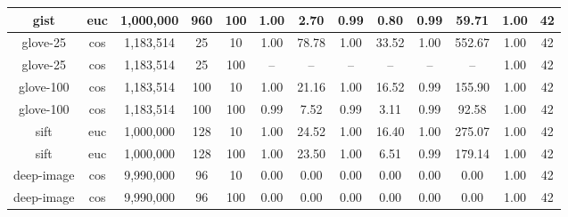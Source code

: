 \begin{table*}[!t]
\begin{center}
\begin{small}
\begin{sc}
\begin{tabular}{|c|c|c|c|c|c|c|c|c|c|c|c|c|}
    \hline
    gist             & euc              & 1,000,000          & 960             & 100        & 1.00 & 2.70                           & 0.99 & 0.80                                 & 0.99 & 59.71                                                    & 1.00 & 42 \\
    \hline
    glove-25         & cos              & 1,183,514          & 25             & 10         & 1.00 & 78.78                          & 1.00 & 33.52                              & 1.00 & 552.67                                                  & 1.00 & 42 \\
    \hline
    glove-25         & cos              & 1,183,514          & 25             & 100        & -- & --                                & -- & --                                & -- & --                                                    & 1.00 & 42 \\
    \hline
    glove-100        & cos              & 1,183,514          & 100            & 10         & 1.00 & 21.16                          & 1.00 & 16.52                                & 0.99 & 155.90                                                  & 1.00 & 42 \\
    \hline
    glove-100        & cos              & 1,183,514          & 100            & 100        & 0.99 &  7.52                          & 0.99 & 3.11                                  & 0.99 & 92.58                                                    & 1.00 & 42 \\
    \hline
    sift             & euc              & 1,000,000          & 128            & 10         & 1.00 &  24.52                          & 1.00 & 16.40                               & 1.00 & 275.07                                                    & 1.00 & 42 \\
    \hline
    sift             & euc              & 1,000,000          & 128            & 100        & 1.00 &  23.50                          & 1.00 & 6.51                                  & 0.99 & 179.14                                                    & 1.00 & 42 \\
    \hline
    deep-image       & cos              & 9,990,000	         & 96             & 10          & 0.00 & 0.00                           & 0.00 & 0.00                                 & 0.00 & 0.00                                                     & 1.00 & 42 \\
    \hline
    deep-image       & cos              & 9,990,000	         & 96             & 100         & 0.00 & 0.00                           & 0.00 & 0.00                                & 0.00 & 0.00                                                    & 1.00 & 42 \\

\end{tabular}
\end{sc}
\end{small}
\end{center}
\end{table*}
